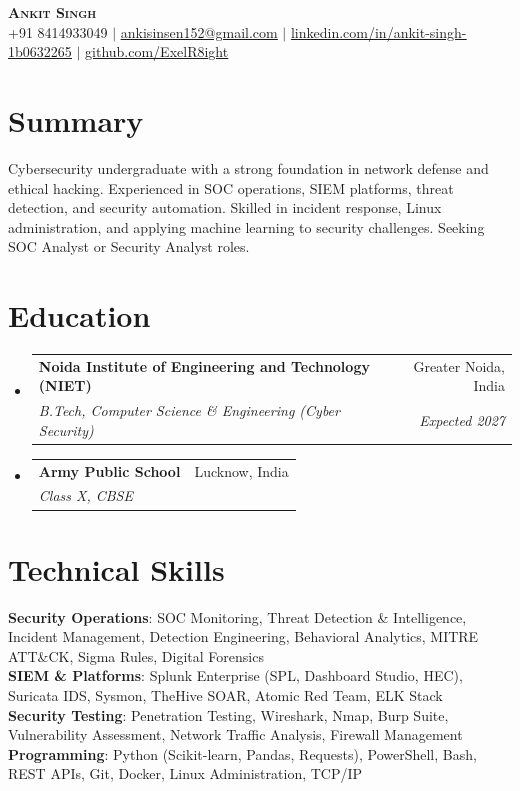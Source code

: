 \documentclass[letterpaper,10pt]{article}
\makeatletter
\newcommand{\resumeSubheading}[4]{
  \vspace{-2pt}\item
    \begin{tabular*}{0.97\textwidth}[t]{l@{\extracolsep{\fill}}r}
      \textbf{#1} & #2 \\
      \textit{\small#3} & \textit{\small #4} \\
    \end{tabular*}\vspace{-7pt}
}
\newcommand{\resumeSubHeadingListStart}{\begin{itemize}[leftmargin=0.15in, label={}]}
\newcommand{\resumeSubHeadingListEnd}{\end{itemize}}
\makeatother
\begin{document}
\begin{center}
    \textbf{\Huge \scshape Ankit Singh} \\ \vspace{1pt}
    \small +91 8414933049 $|$
    \href{mailto:ankisinsen152@gmail.com}{\underline{ankisinsen152@gmail.com}} $|$
    \href{https://linkedin.com/in/ankit-singh-1b0632265}{\underline{linkedin.com/in/ankit-singh-1b0632265}} $|$
    \href{https://github.com/ExelR8ight}{\underline{github.com/ExelR8ight}}
\end{center}

\section{Summary}
 \begin{itemize}[leftmargin=0.15in, label={}]
    \small{\item{
     Cybersecurity undergraduate with a strong foundation in network defense and ethical hacking. Experienced in SOC operations, SIEM platforms, threat detection, and security automation. Skilled in incident response, Linux administration, and applying machine learning to security challenges. Seeking SOC Analyst or Security Analyst roles.
    }}
 \end{itemize}

\section{Education}
  \resumeSubHeadingListStart
    \resumeSubheading
      {Noida Institute of Engineering and Technology (NIET)}{Greater Noida, India}
      {B.Tech, Computer Science \& Engineering (Cyber Security)}{Expected 2027}
    \resumeSubheading
      {Army Public School}{Lucknow, India}
      {Class X, CBSE}{}
  \resumeSubHeadingListEnd

\section{Technical Skills}
 \begin{itemize}[leftmargin=0.15in, label={}]
    \small{\item{
     \textbf{Security Operations}{: SOC Monitoring, Threat Detection \& Intelligence, Incident Management, Detection Engineering, Behavioral Analytics, MITRE ATT\&CK, Sigma Rules, Digital Forensics} \\
     \textbf{SIEM \& Platforms}{: Splunk Enterprise (SPL, Dashboard Studio, HEC), Suricata IDS, Sysmon, TheHive SOAR, Atomic Red Team, ELK Stack} \\
     \textbf{Security Testing}{: Penetration Testing, Wireshark, Nmap, Burp Suite, Vulnerability Assessment, Network Traffic Analysis, Firewall Management} \\
     \textbf{Programming}{: Python (Scikit-learn, Pandas, Requests), PowerShell, Bash, REST APIs, Git, Docker, Linux Administration, TCP/IP}
    }}
 \end{itemize}
\end{document}
